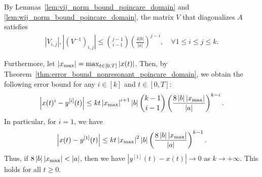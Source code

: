 \documentclass[superscriptaddress,onecolumn,nofootinbib,longbibliography,a4paper,accepted=2026-09-29]{quantumarticle}
\theoremstyle{plain}
\theoremstyle{definition}
\numberwithin{thm}{section}
\numberwithin{assumption}{section}
\numberwithin{lemma}{section}
\numberwithin{prop}{section}
\numberwithin{cor}{section}
\numberwithin{definition}{section}
\numberwithin{rmk}{section}
\numberwithin{equation}{section}
\newcommand{\abs}[1]      {\left| #1 \right|}
\newcommand{\lrb}[1]{\left ( #1 \right )}
\begin{document}
By Lemmas~\ref{lem:vij_norm_bound_poincare_domain}
and \ref{lem:wij_norm_bound_poincare_domain}, the matrix $V$ that diagonalizes $A$ satisfies
\begin{align}
\abs{V_{i,j}}, \abs{(V^{-1})_{i,j}} \le \binom{j-1}{i-1} \lrb{\frac{4\abs{b}}{\abs{a}}}^{j-i}, \quad \forall 1\le i\le j \le k. 
\label{eq:vij_v_inv_ij_abs_bounds_1d}
\end{align}

Furthermore, let $\abs{x_{\rm max}}=\max_{t \in [0,T]}\abs{x(t)}$. Then, by Theorem~\ref{thm:error_bound_nonresonant_poincare_domain}, we obtain the following error bound for any $i \in [k]$ and $t \in [0, T]$:
\begin{align}
    \abs{x(t)^{i}-y^{[i]}(t)} \le k t  \abs{x_{\rm max}}^{i+1} \abs{b} \binom{k-1}{i-1} \lrb{\frac{8 \abs{b}\abs{x_{\rm max}}}{\abs{a}}}^{k-i}.
\end{align}
In particular, for $i=1$, we have
\begin{align}
    \abs{x(t) -y^{[1]}(t)} \le k t  \abs{x_{\rm max}}^{2} \abs{b}  \lrb{\frac{8 \abs{b} \abs{x_{\rm max}}}{\abs{a}}}^{k-1}.
\end{align}
Thus, if $8\abs{b}\abs{x_{\rm max}}<\abs{a}$, then we have $|y^{[1]}(t) - x(t)| \to 0$ as $k \to +\infty$. This holds for all $t \ge 0$.
\end{document}
